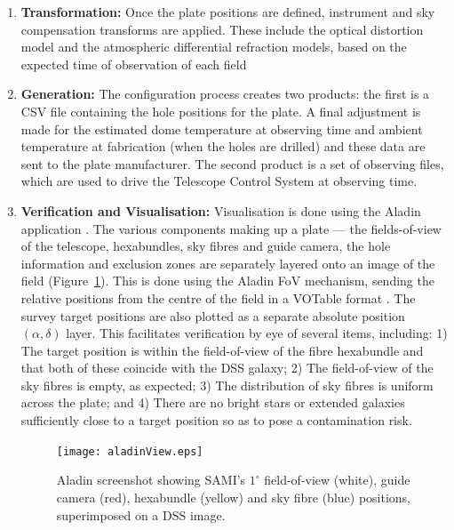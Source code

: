\documentclass[11pt,twoside]{article}
\begin{document}
\begin{enumerate}
\item{\bf Transformation:} Once the plate positions are defined,
  instrument and sky compensation transforms are applied. These
  include the optical distortion model and the atmospheric
  differential refraction models, based on the expected time of
  observation of each field

\item{\bf Generation:} The configuration process creates two products:
  the first is a CSV file containing the hole positions for the plate. A final
  adjustment is made for the estimated dome temperature at observing time
  and ambient temperature at fabrication (when the holes are drilled)
  and these data are sent to the plate manufacturer. The second
  product is a set of observing files, which are used to drive the Telescope
  Control System at observing time.

\item{\bf Verification and Visualisation:} Visualisation is done using
  the Aladin application \citep{2000bfb+}. The various components
  making up a plate --- the fields-of-view of the telescope,
  hexabundles, sky fibres and guide camera, the hole information and
  exclusion zones are separately layered onto an image of the
  field (Figure~\ref{p048_FigAladin}). This is done using the Aladin FoV mechanism, sending the
  relative positions from the centre of the field in a VOTable
  format \citep{2011owd+}. The survey target positions are also plotted as a separate
  absolute position $(\alpha, \delta)$ layer. This facilitates
  verification by eye of several items, including:
1) The target position is within the field-of-view of the fibre
  hexabundle and that both of these coincide with the DSS galaxy;
2) The field-of-view of the sky fibres is empty, as expected;
3) The distribution of sky fibres is uniform across the plate; and
4) There are no bright stars or extended galaxies sufficiently
  close to a target position so as to pose a contamination risk.



\begin{figure}[ht]
\centering
\texttt{[image: aladinView.eps]}
\caption{Aladin screenshot showing SAMI's $1^\circ$ field-of-view (white),
  guide camera (red), hexabundle (yellow)
  and sky fibre (blue) positions, superimposed on a DSS image.}
\label{p048_FigAladin}
\end{figure}

\end{enumerate}
\end{document}
